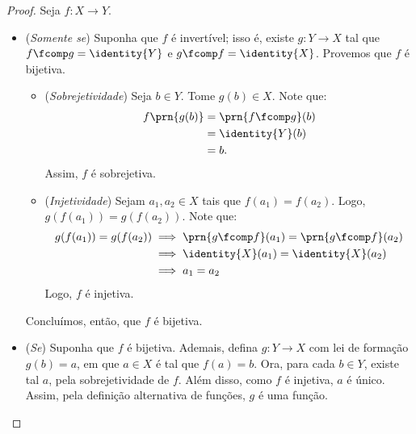 \begin{proof}
    Seja  $f: X \to Y$.
    \begin{itemize}
        \item (\emph{Somente se}) Suponha que $f$ é invertível; isso é, existe $g : Y \to X$ tal que $f \fcomp g = \identity{Y}$ e $g \fcomp f = \identity{X}$.
        Provemos que $f$ é bijetiva. 
        \begin{itemize}
            \item (\emph{Sobrejetividade}) Seja $b \in Y$.
            Tome $g(b)\in X$.
            Note que:
            \begin{align*}
                f\prn{g(b)} &= \prn{f \fcomp g}(b) \\ &= \identity{Y}(b) \\ &= b.
            \end{align*}
            Assim, $f$ é sobrejetiva.
            \item (\emph{Injetividade}) Sejam $a_1, a_2 \in X$ tais que $f(a_1)=f(a_2)$.
            Logo, $g(f(a_1))=g(f(a_2))$.
            Note que:
            \begin{align*}
                g(f(a_1))=g(f(a_2)) & \implies \prn{g \fcomp f}(a_1) = \prn{g \fcomp f}(a_2) \\
                & \implies \identity{X}(a_1) = \identity{X}(a_2) \\
                & \implies a_1 = a_2
            \end{align*}
            Logo, $f$ é injetiva.
        \end{itemize}
        Concluímos, então, que $f$ é bijetiva.

        \item (\emph{Se}) Suponha que $f$ é bijetiva.
        Ademais, defina $g: Y \to X$ com lei de formação $g(b)=a$, em que $a \in X$ é tal que $f(a)=b$.
        Ora, para cada $b \in Y$, existe tal $a$, pela sobrejetividade de $f$.
        Além disso, como $f$ é injetiva, $a$ é único. 
        Assim, pela definição alternativa de funções, $g$ é uma função.


\end{itemize}
\end{proof}
